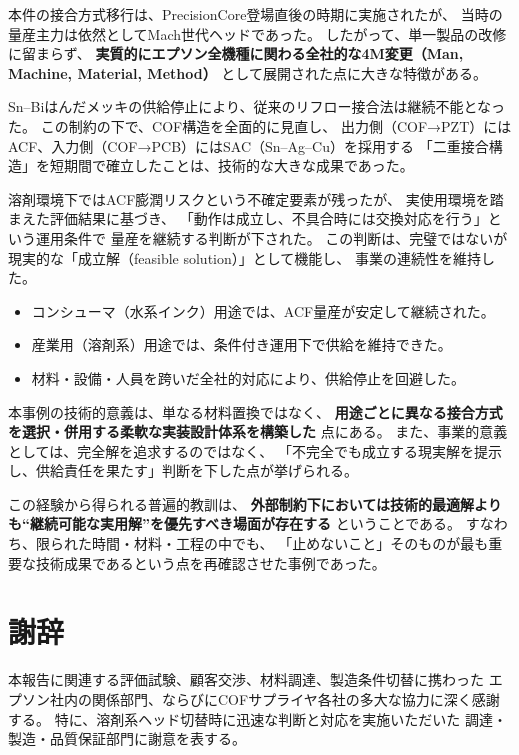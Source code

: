 \documentclass[conference]{IEEEtran}
\begin{document}
本件の接合方式移行は、PrecisionCore登場直後の時期に実施されたが、  
当時の量産主力は依然としてMach世代ヘッドであった。  
したがって、単一製品の改修に留まらず、  
\textbf{実質的にエプソン全機種に関わる全社的な4M変更（Man, Machine, Material, Method）}  
として展開された点に大きな特徴がある。  

Sn–Biはんだメッキの供給停止により、従来のリフロー接合法は継続不能となった。  
この制約の下で、COF構造を全面的に見直し、  
出力側（COF→PZT）にはACF、入力側（COF→PCB）にはSAC（Sn–Ag–Cu）を採用する  
「二重接合構造」を短期間で確立したことは、技術的な大きな成果であった。  

溶剤環境下ではACF膨潤リスクという不確定要素が残ったが、  
実使用環境を踏まえた評価結果に基づき、  
「動作は成立し、不具合時には交換対応を行う」という運用条件で  
量産を継続する判断が下された。  
この判断は、完璧ではないが現実的な「成立解（feasible solution）」として機能し、  
事業の連続性を維持した。

\begin{itemize}
  \item コンシューマ（水系インク）用途では、ACF量産が安定して継続された。  
  \item 産業用（溶剤系）用途では、条件付き運用下で供給を維持できた。  
  \item 材料・設備・人員を跨いだ全社的対応により、供給停止を回避した。  
\end{itemize}

本事例の技術的意義は、単なる材料置換ではなく、  
\textbf{用途ごとに異なる接合方式を選択・併用する柔軟な実装設計体系を構築した}  
点にある。  
また、事業的意義としては、完全解を追求するのではなく、  
「不完全でも成立する現実解を提示し、供給責任を果たす」判断を下した点が挙げられる。  

この経験から得られる普遍的教訓は、  
\textbf{外部制約下においては技術的最適解よりも“継続可能な実用解”を優先すべき場面が存在する}  
ということである。  
すなわち、限られた時間・材料・工程の中でも、  
「止めないこと」そのものが最も重要な技術成果であるという点を再確認させた事例であった。

\section*{謝辞}

本報告に関連する評価試験、顧客交渉、材料調達、製造条件切替に携わった  
エプソン社内の関係部門、ならびにCOFサプライヤ各社の多大な協力に深く感謝する。  
特に、溶剤系ヘッド切替時に迅速な判断と対応を実施いただいた  
調達・製造・品質保証部門に謝意を表する。
\end{document}
